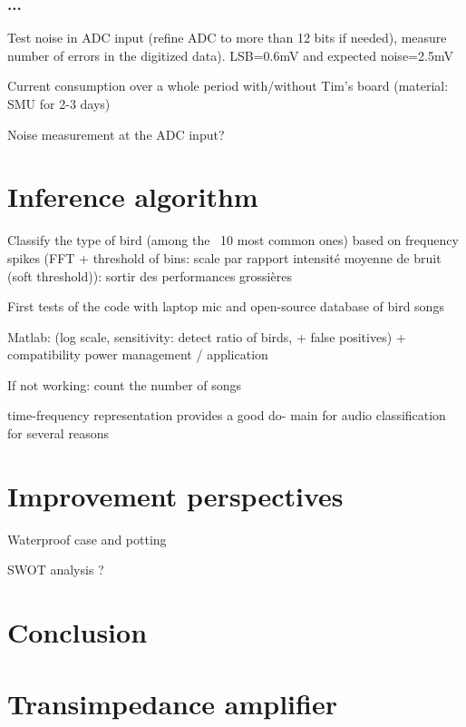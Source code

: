 \documentclass{EPL-master-thesis-covers-EN}
\begin{document}
\subsection*{...}

Test noise in ADC input (refine ADC to more than 12 bits if needed), measure number of errors in the digitized data). LSB=0.6mV and expected noise=2.5mV

    Current consumption over a whole period with/without Tim's board (material: SMU for 2-3 days)​

    

    Noise measurement at the ADC input?

    
\chapter{Inference algorithm}

    Classify the type of bird (among the ~10 most common ones) based on frequency spikes (FFT + threshold of bins: scale par rapport intensité moyenne de bruit (soft threshold)): sortir des performances grossières​

    First tests of the code with laptop mic and open-source database of bird songs​

    Matlab: (log scale, sensitivity: detect ratio of birds, + false positives) + compatibility power management / application​

    If not working: count the number of songs
    
    time-frequency representation provides a good do-
main for audio classification for several reasons

\chapter{Improvement perspectives}

Waterproof case and potting

SWOT analysis ?

\chapter{Conclusion}

\appendix

\chapter{Transimpedance amplifier}
\label{appendix:transimpedance}
\end{document}

